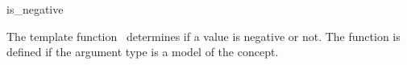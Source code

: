 \begin{ccRefFunction}{is_negative}

\ccDefinition

The template function \ccRefName\ determines if a value is negative or not.
The function is defined if the argument type 
is a model of the  concept. 

 


\ccSeeAlso
{} \\
\\

\end{ccRefFunction}
